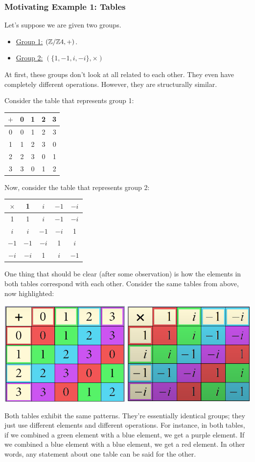 \documentclass[letterpaper]{article}
\begin{document}
\subsubsection{Motivating Example 1: Tables}
Let's suppose we are given two groups.
\begin{itemize}
    \item \underline{Group 1:} $(\mathbb{Z} / \mathbb{Z} 4, +)$. 
    \item \underline{Group 2:} $(\{1, -1, i, -i\}, \times)$
\end{itemize}
At first, these groups don't look at all related to each other. They even have completely different operations. However, they are structurally similar. 

\bigskip 

Consider the table that represents group 1:
\begin{center}
    \begin{tabular}{c|c c c c}
        $+$     & 0 & 1 & 2 & 3 \\ 
        \hline 
        0       & 0 & 1 & 2 & 3 \\
        1       & 1 & 2 & 3 & 0 \\ 
        2       & 2 & 3 & 0 & 1 \\ 
        3       & 3 & 0 & 1 & 2
    \end{tabular}
\end{center}
Now, consider the table that represents group 2: 
\begin{center}
    \begin{tabular}{c|c c c c}
        $\times$ & 1 & $i$ & $-1$ & $-i$ \\ 
        \hline 
        1        & 1 & $i$ & $-1$ & $-i$ \\ 
        $i$      & $i$ & $-1$ & $-i$ & 1 \\ 
        $-1$     & $-1$ & $-i$ & 1 & $i$ \\ 
        $-i$     & $-i$ & 1 & $i$ & $-1$
    \end{tabular}
\end{center}
One thing that should be clear (after some observation) is how the elements in both tables correspond with each other. Consider the same tables from above, now highlighted: 
\begin{center}
    \includegraphics[scale=0.5]{assets/homo_ex.png}
\end{center}
Both tables exhibit the same patterns. They're essentially identical groups; they just use different elements and different operations. For instance, in both tables, if we combined a green element with a blue element, we get a purple element. If we combined a blue element with a blue element, we get a red element. In other words, any statement about one table can be said for the other. 
\end{document}
